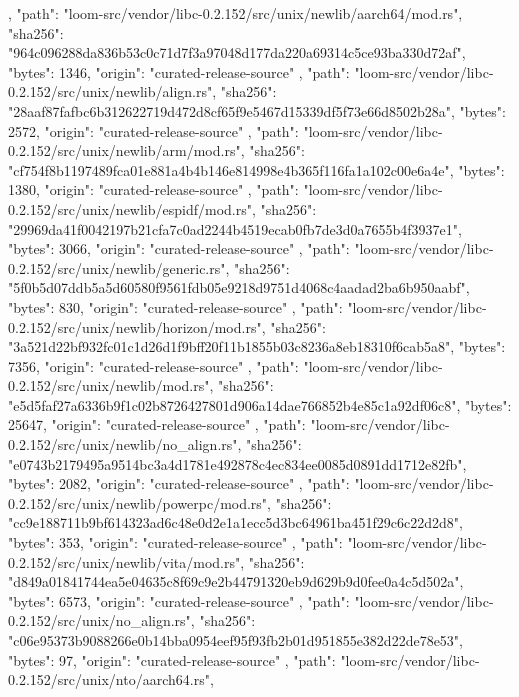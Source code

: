 {{    },
    {
      "path": "loom-src/vendor/libc-0.2.152/src/unix/newlib/aarch64/mod.rs",
      "sha256": "964c096288da836b53c0c71d7f3a97048d177da220a69314c5ce93ba330d72af",
      "bytes": 1346,
      "origin": "curated-release-source"
    },
    {
      "path": "loom-src/vendor/libc-0.2.152/src/unix/newlib/align.rs",
      "sha256": "28aaf87fafbc6b312622719d472d8cf65f9e5467d15339df5f73e66d8502b28a",
      "bytes": 2572,
      "origin": "curated-release-source"
    },
    {
      "path": "loom-src/vendor/libc-0.2.152/src/unix/newlib/arm/mod.rs",
      "sha256": "cf754f8b1197489fca01e881a4b4b146e814998e4b365f116fa1a102c00e6a4e",
      "bytes": 1380,
      "origin": "curated-release-source"
    },
    {
      "path": "loom-src/vendor/libc-0.2.152/src/unix/newlib/espidf/mod.rs",
      "sha256": "29969da41f0042197b21cfa7c0ad2244b4519ecab0fb7de3d0a7655b4f3937e1",
      "bytes": 3066,
      "origin": "curated-release-source"
    },
    {
      "path": "loom-src/vendor/libc-0.2.152/src/unix/newlib/generic.rs",
      "sha256": "5f0b5d07ddb5a5d60580f9561fdb05e9218d9751d4068c4aadad2ba6b950aabf",
      "bytes": 830,
      "origin": "curated-release-source"
    },
    {
      "path": "loom-src/vendor/libc-0.2.152/src/unix/newlib/horizon/mod.rs",
      "sha256": "3a521d22bf932fc01c1d26d1f9bff20f11b1855b03c8236a8eb18310f6cab5a8",
      "bytes": 7356,
      "origin": "curated-release-source"
    },
    {
      "path": "loom-src/vendor/libc-0.2.152/src/unix/newlib/mod.rs",
      "sha256": "e5d5faf27a6336b9f1c02b8726427801d906a14dae766852b4e85c1a92df06c8",
      "bytes": 25647,
      "origin": "curated-release-source"
    },
    {
      "path": "loom-src/vendor/libc-0.2.152/src/unix/newlib/no_align.rs",
      "sha256": "e0743b2179495a9514bc3a4d1781e492878c4ec834ee0085d0891dd1712e82fb",
      "bytes": 2082,
      "origin": "curated-release-source"
    },
    {
      "path": "loom-src/vendor/libc-0.2.152/src/unix/newlib/powerpc/mod.rs",
      "sha256": "cc9e188711b9bf614323ad6c48e0d2e1a1ecc5d3bc64961ba451f29c6c22d2d8",
      "bytes": 353,
      "origin": "curated-release-source"
    },
    {
      "path": "loom-src/vendor/libc-0.2.152/src/unix/newlib/vita/mod.rs",
      "sha256": "d849a01841744ea5e04635c8f69c9e2b44791320eb9d629b9d0fee0a4c5d502a",
      "bytes": 6573,
      "origin": "curated-release-source"
    },
    {
      "path": "loom-src/vendor/libc-0.2.152/src/unix/no_align.rs",
      "sha256": "c06e95373b9088266e0b14bba0954eef95f93fb2b01d951855e382d22de78e53",
      "bytes": 97,
      "origin": "curated-release-source"
    },
    {
      "path": "loom-src/vendor/libc-0.2.152/src/unix/nto/aarch64.rs",
}}
